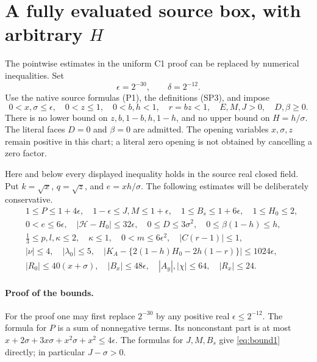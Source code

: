 \section{A fully evaluated source box, with arbitrary \texorpdfstring{$H$}{H}}
\label{sec:sourcebox}
The pointwise estimates in the uniform C1 proof can be replaced by numerical
inequalities. Set
\[
 \epsilon=2^{-30},\qquad \delta=2^{-12}.
\]
Use the native source formulas (P1), the definitions (SP3), and impose
\begin{equation}\label{eq:sourcebox}
 0<x,\sigma\le\epsilon,\quad 0<z\le1,\quad 0<b,h<1,\quad
 r=bz<1,\quad E,M,J>0,\quad D,\beta\ge0.
\end{equation}
There is no lower bound on $z,b,1-b,h,1-h$, and no upper bound on
$H=h/\sigma$. The literal faces $D=0$ and $\beta=0$ are admitted.
The opening variables $x,\sigma,z$ remain positive in this chart; a
literal zero opening is not obtained by cancelling a zero factor.

Here and below every displayed inequality holds in the source real
closed field. Put $k=\sqrt x$, $q=\sqrt z$, and $e=xh/\sigma$.
The following estimates will be deliberately conservative.
\begin{align}
 &1\le P\le1+4\epsilon,\quad
  1-\epsilon\le J,M\le1+\epsilon,\quad
 1\le B_s\le1+6\epsilon,\quad 1\le H_0\le2,\label{eq:bound1}\\
 &0<e\le6\epsilon,\quad
 |\mathcal H-H_0|\le32\epsilon,\quad
 0\le D\le3\sigma^2,\quad 0\le\beta(1-h)\le h,\label{eq:bound2}\\
 &\tfrac13\le p,l,\kappa\le2,\quad\kappa\le1,
 \quad 0<m\le6\epsilon^2,\quad |C(r-1)|\le1,\label{eq:bound3}\\
 &|\nu|\le4,\quad |\lambda_0|\le5,\quad
 |K_A-\{2(1-h)H_0-2h(1-r)\}|\le1024\epsilon,\label{eq:bound4}\\
 &|R_0|\le40(x+\sigma),\quad |B_x|\le48\epsilon,
 \quad |A_y|,|\chi|\le64,\quad |R_x|\le24.\label{eq:bound5}
\end{align}

\paragraph{Proof of the bounds.}
For the proof one may first replace $2^{-30}$ by any positive real
$\epsilon\le2^{-12}$. The formula for $P$ is a sum of nonnegative
terms. Its nonconstant part is at most
$x+2\sigma+3x\sigma+x^2\sigma+x^2\le4\epsilon$.
The formulas for $J,M,B_s$ give \eqref{eq:bound1} directly; in particular
$J-\sigma>0$.

